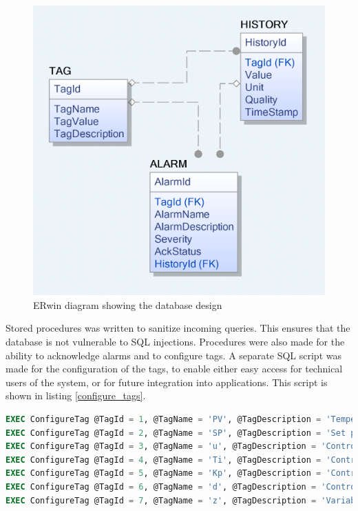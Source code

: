 \documentclass[conference]{IEEEtran}
\begin{document}
\begin{figure}[H]
    \centering
    \includegraphics[scale=0.4]{media/erwin_diagram.png}
    \caption{ERwin diagram showing the database design}
    \label{erwin_diagram}
\end{figure}

Stored procedures was written to sanitize incoming queries. This ensures that the database is not vulnerable to SQL injections. Procedures were also made for the ability to acknowledge alarms and to configure tags. A separate SQL script was made for the configuration of the tags, to enable either easy access for technical users of the system, or for future integration into applications. This script is shown in listing \ref{configure_tags}.

\begin{lstlisting}[caption={ConfigureTags.sql}, label={configure_tags},language=SQL]
EXEC ConfigureTag @TagId = 1, @TagName = 'PV', @TagDescription = 'Temperature measured on the outlet of the Process';
EXEC ConfigureTag @TagId = 2, @TagName = 'SP', @TagDescription = 'Set point for the desired Temperature';
EXEC ConfigureTag @TagId = 3, @TagName = 'u', @TagDescription = 'Control value sent to the Air Heater';
EXEC ConfigureTag @TagId = 4, @TagName = 'Ti', @TagDescription = 'Controller Integral parameter';
EXEC ConfigureTag @TagId = 5, @TagName = 'Kp', @TagDescription = 'Controller Proportional parameter';
EXEC ConfigureTag @TagId = 6, @TagName = 'd', @TagDescription = 'Controller Derivative parameter';
EXEC ConfigureTag @TagId = 7, @TagName = 'z', @TagDescription = 'Variable for integral calculation';
\end{lstlisting}
\end{document}
